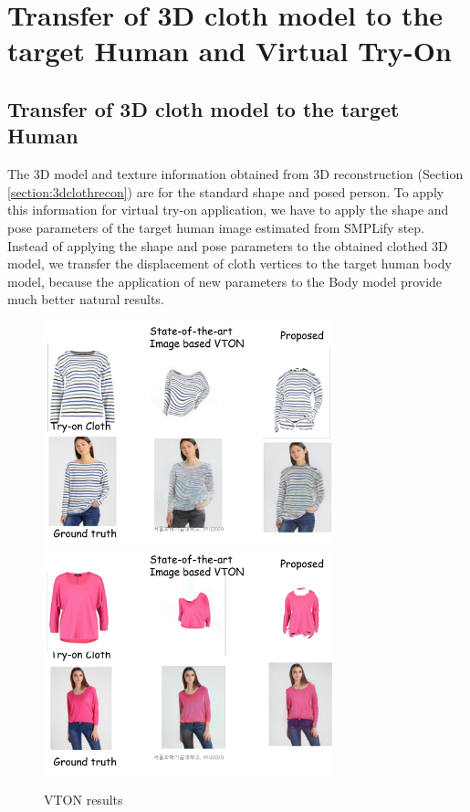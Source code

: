 \section{Transfer of 3D cloth model to the target Human and Virtual Try-On }  \label{section:clothtransfer}


\subsection{Transfer of 3D cloth model to the target Human} 

The 3D model and texture information obtained from 3D reconstruction (Section \ref{section:3dclothrecon}) are for the standard shape and posed person. To apply this information for virtual try-on application, we have to apply the shape and pose parameters of the target human image estimated from SMPLify\cite{Bogo2016SMPLify} step.  Instead of applying the shape and pose parameters to the obtained clothed 3D model, we transfer the displacement of cloth vertices to the target human body model, because the application of new parameters to the Body model provide much better natural results.      


\begin{figure}[t]
\centering
\includegraphics[height=6.5cm, scale=1]{figures/vton_result1.png} 
\includegraphics[height=6.5cm, scale=1]{figures/vton_result2.png} 
\caption{VTON results}
\label{fig:vtonresults}
\end{figure}


